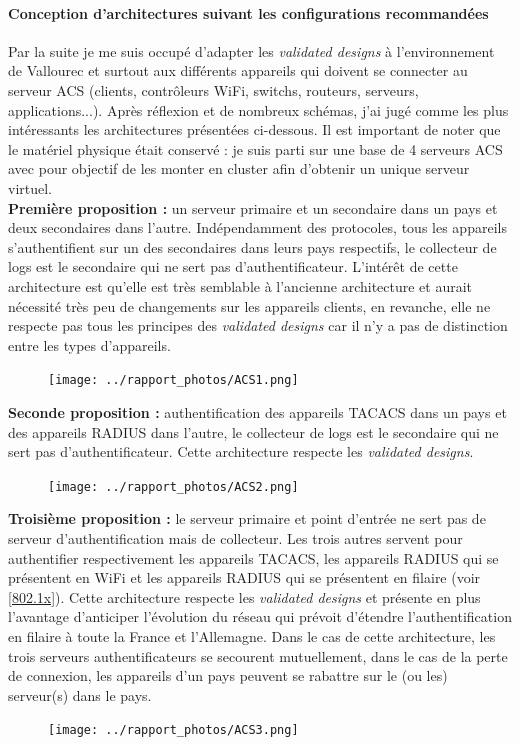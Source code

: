\documentclass[a4paper,12pt]{report}
\begin{document}
\paragraph*{Conception d'architectures suivant les configurations recommandées}
Par la suite je me suis occupé d'adapter les \textit{validated designs} à l'environnement de Vallourec et surtout aux différents appareils qui doivent se connecter au serveur ACS (clients, contrôleurs WiFi, switchs, routeurs, serveurs, applications...). Après réflexion et de nombreux schémas, j'ai jugé comme les plus intéressants les architectures présentées ci-dessous. Il est important de noter que le matériel physique était conservé : je suis parti sur une base de 4 serveurs ACS avec pour objectif de les monter en cluster afin d'obtenir un unique serveur virtuel.
\\

\textbf{Première proposition :} un serveur primaire et un secondaire dans un pays et deux secondaires dans l'autre. Indépendamment des protocoles, tous les appareils s'authentifient sur un des secondaires dans leurs pays respectifs, le collecteur de logs est le secondaire qui ne sert pas d'authentificateur. L'intérêt de cette architecture est qu'elle est très semblable à l'ancienne architecture et aurait nécessité très peu de changements sur les appareils clients, en revanche, elle ne respecte pas tous les principes des \textit{validated designs} car il n'y a pas de distinction entre les types d'appareils.
\begin{figure}[h]
\centering
\texttt{[image: ../rapport\_photos/ACS1.png]} 
\end{figure}

\textbf{Seconde proposition :} authentification des appareils TACACS dans un pays et des appareils RADIUS dans l'autre, le collecteur de logs est le secondaire qui ne sert pas d'authentificateur. Cette architecture respecte les \textit{validated designs}.
\begin{figure}[h]
\centering
\texttt{[image: ../rapport\_photos/ACS2.png]} 
\end{figure}

\textbf{Troisième proposition :} le serveur primaire et point d'entrée ne sert pas de serveur d'authentification mais de collecteur. Les trois autres servent pour authentifier respectivement les appareils TACACS, les appareils RADIUS qui se présentent en WiFi et les appareils RADIUS qui se présentent en filaire (voir \ref{802.1x}). Cette architecture respecte les \textit{validated designs} et présente en plus l'avantage d'anticiper l'évolution du réseau qui prévoit d'étendre l'authentification en filaire à toute la France et l'Allemagne. Dans le cas de cette architecture, les trois serveurs authentificateurs se secourent mutuellement, dans le cas de la perte de connexion, les appareils d'un pays peuvent se rabattre sur le (ou les) serveur(s) dans le pays.
\begin{figure}[h]
\centering
\texttt{[image: ../rapport\_photos/ACS3.png]}
\end{figure}
\end{document}
